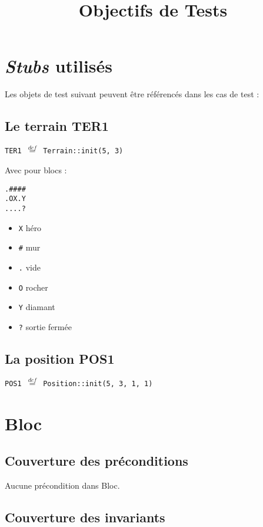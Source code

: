 \documentclass{article}
\title{Objectifs de Tests}
\author{}
\date{}
\newcommand{\cmd}[1]{\texttt{#1}}
\newcommand{\eqdef}{$\overset{def}{=}$}
\begin{document}
\maketitle{}

\section{\emph{Stubs} utilisés}

Les objets de test suivant peuvent être référencés dans les cas de test :

\subsection{Le terrain TER1}

\cmd{TER1 \eqdef{} Terrain::init(5, 3)}

Avec pour blocs :

\begin{verbatim}
.####
.OX.Y
....?
\end{verbatim}

\begin{itemize}
	\item \cmd{X} héro
	\item \cmd{\#} mur
	\item \cmd{.} vide
	\item \cmd{O} rocher
	\item \cmd{Y} diamant
	\item \cmd{?} sortie fermée
\end{itemize}

\subsection{La position POS1}

\cmd{POS1 \eqdef{} Position::init(5, 3, 1, 1)}

\clearpage{}




\section{Bloc}

\subsection{Couverture des préconditions}

Aucune précondition dans Bloc.

\subsection{Couverture des invariants}
\end{document}
